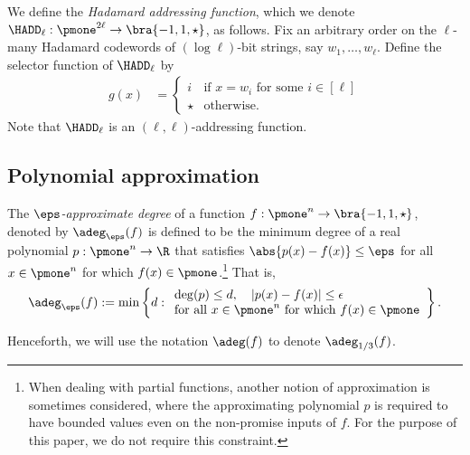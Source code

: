 \begin{definition}\label{defn: hadd}
We define the \emph{Hadamard addressing function}, which we denote $\HADD_\ell : \pmone^{2\ell} \to \bra{-1, 1, \star}$, as follows.
Fix an arbitrary order on the $\ell$-many Hadamard codewords of $(\log \ell)$-bit strings, say $w_1, \dots, w_\ell$.  Define the selector function of $\HADD_\ell$ by
\begin{align*}
g(x) & =\begin{cases}
i & \text{if~} x = w_i \text{~for some~} i \in [\ell]\\
\star & \text{otherwise}.
\end{cases}
\end{align*}
Note that $\HADD_\ell$ is an $(\ell, \ell)$-addressing function.
\end{definition}

\subsection{Polynomial approximation}

\begin{definition}\label{defn: adeg}
The \emph{$\eps$-approximate degree} of a function $f : \pmone^n \to \bra{-1, 1, \star}$, denoted by $\adeg_\eps(f)$ is defined to be the minimum degree of a real polynomial $p : \pmone^n \to \R$ that satisfies $\abs{p(x) - f(x)} \leq \eps$ for all $x \in \pmone^n$ for which $f(x) \in \pmone$.\footnote{When dealing with partial functions, another notion of approximation is sometimes considered, where the approximating polynomial $p$ is required to have bounded values even on the non-promise inputs of $f$.  For the purpose of this paper, we do not require this constraint.} That is,
\[
\adeg_\eps(f):=\min\left\{d:\begin{array}{l}\deg(p)\leq d,\quad |p(x)-f(x)|\leq\epsilon\\\text{for all }x\in\pmone^n\text{ for which }f(x)\in\pmone\end{array}\right\}.
\]
\end{definition}
Henceforth, we will use the notation $\adeg(f)$ to denote $\adeg_{1/3}(f)$.

